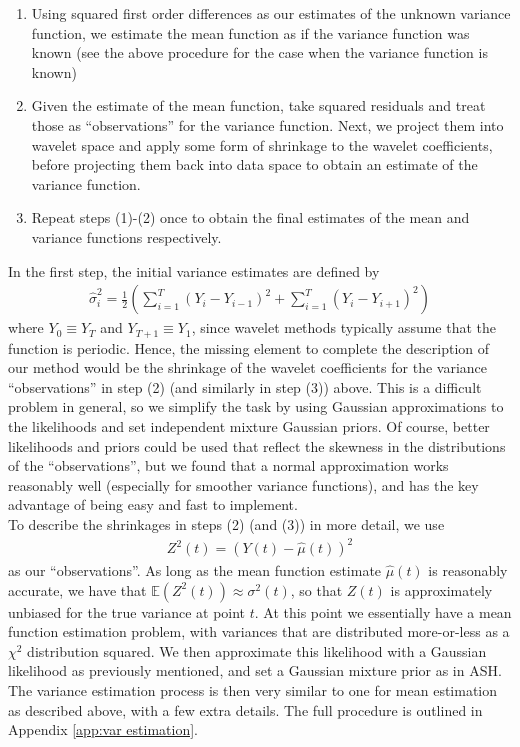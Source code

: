 \documentclass[12pt]{article}
\newcommand{\s}{\sigma}
\begin{document}
\begin{enumerate}
\item Using squared first order differences as our estimates of the unknown variance function, we estimate the mean function as if the variance function was known (see the above procedure for the case when the variance function is known)
\item Given the estimate of the mean function, take squared residuals and treat those as ``observations'' for the variance function. Next, we project them into wavelet space and apply some form of shrinkage to the wavelet coefficients, before projecting them back into data space to obtain an estimate of the variance function.
\item Repeat steps (1)-(2) once to obtain the final estimates of the mean and variance functions respectively.
\end{enumerate}
In the first step, the initial variance estimates are defined by
\begin{eqnarray}
\hat{\s}_i^2=\frac{1}{2}\left(\sum_{i=1}^T(Y_i-Y_{i-1})^2+\sum_{i=1}^T(Y_i-Y_{i+1})^2\right)
\end{eqnarray}
where $Y_0\equiv Y_T$ and $Y_{T+1}\equiv Y_1$, since wavelet methods typically assume that the function is periodic. Hence, the missing element to complete the description of our method would be the shrinkage of the wavelet coefficients for the variance ``observations'' in step (2) (and similarly in step (3)) above. This is a difficult problem in general, so we simplify the task by using Gaussian approximations to the likelihoods and set independent mixture Gaussian priors. Of course, better likelihoods and priors could be used that reflect the skewness in the distributions of the ``observations'', but we found that a normal approximation works reasonably well (especially for smoother variance functions), and has the key advantage of being easy and fast to implement.\bigskip\\
To describe the shrinkages in steps (2) (and (3)) in more detail, we use
\begin{eqnarray}\label{eq:varobs1}
Z^2(t)=(Y(t)-\hat{\mu}(t))^2
\end{eqnarray}
as our ``observations''. As long as the mean function estimate $\hat{\mu}(t)$ is reasonably accurate, we have that $\mathbb{E}(Z^2(t))\approx\s^2(t)$, so that $Z(t)$ is approximately unbiased for the true variance at point $t$. At this point we essentially have a mean function estimation problem, with variances that are distributed more-or-less as a $\chi^2$ distribution squared. We then approximate this likelihood with a Gaussian likelihood as previously mentioned, and set a Gaussian mixture prior as in ASH. The variance estimation process is then very similar to one for mean estimation as described above, with a few extra details. The full procedure is outlined in Appendix \ref{app:var estimation}. \bigskip\\
\end{document}
